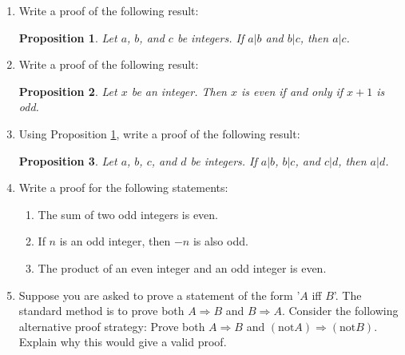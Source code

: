 \documentclass[11pt]{preprint}
\newtheorem{proposition}{Proposition}
\begin{document}
\begin{enumerate}
\item Write a proof of the following result:
\begin{proposition}\label{prop:divtrans}
Let $a$, $b$, and $c$ be integers. If $a|b$ and $b|c$, then $a|c$.
\end{proposition}

\item Write a proof of the following result:
\begin{proposition}
Let $x$ be an integer. Then $x$ is even if and only if $x+1$ is odd.
\end{proposition}

\item Using Proposition \ref{prop:divtrans}, write a proof of the following result:

\begin{proposition}
Let $a$, $b$, $c$, and $d$ be integers. If $a|b$, $b|c$, and $c|d$, then $a|d$.
\end{proposition}

\item Write a proof for the following statements:
\begin{enumerate}
\item The sum of two odd integers is even.
\item If $n$ is an odd integer, then $-n$ is also odd.
\item The product of an even integer and an odd integer is even.
\end{enumerate}


\item Suppose you are asked to prove a statement of the form '$A$ iff $B$'. The standard method is to prove both $A\Rightarrow B$ and $B\Rightarrow A$. Consider the following alternative proof strategy: Prove both $A\Rightarrow B$ and $(\textrm{not} A)\Rightarrow (\textrm{not} B)$. Explain why this would give a valid proof.

\end{enumerate}
\end{document}
